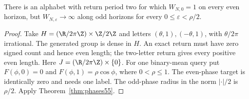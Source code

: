 \begin{proposition}\label{prop:parity55}
There is an alphabet with return period two for which $W_{N,0}=1$ on every even horizon, but $W_{N,\varepsilon}\to\infty$ along odd horizons for every $0\le\varepsilon<\rho/2$.
\end{proposition}
\begin{proof}
Take $H=(\R/2\pi\Z)\times\Z/2\Z$ and letters $(\theta,1),(-\theta,1)$, with $\theta/2\pi$ irrational. The generated group is dense in $H$. An exact return must have zero signed count and hence even length; the two-letter return gives every positive even length. Here $J=(\R/2\pi\Z)\times\{0\}$. For one binary-mean query put $F(\phi,0)=0$ and $F(\phi,1)=\rho\cos\phi$, where $0<\rho\le1$. The even-phase target is identically zero and needs one label. The odd-phase radius in the norm $|\cdot|/2$ is $\rho/2$. Apply Theorem~\ref{thm:phases55}.
\end{proof}
